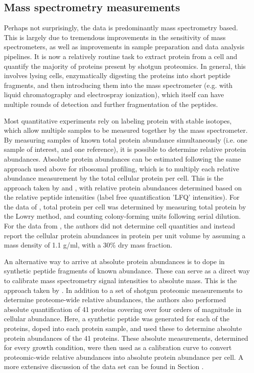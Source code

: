 \subsection{Mass spectrometry measurements}
Perhaps not surprisingly, the data is predominantly mass spectrometry based. This is
largely due to tremendous improvements in the sensitivity of mass spectrometers,
as well as improvements in sample preparation and data analysis
pipelines. It is now a relatively routine task to extract protein from a cell
and quantify the majority of proteins present by shotgun proteomics. In general, this
involves lysing cells, enzymatically digesting the proteins into short peptide
fragments, and then introducing them into the mass spectrometer (e.g.
with liquid chromatography and electrospray ionization), which itself can
have multiple rounds of detection and further fragmentation of the peptides.

Most quantitative experiments rely on labeling protein with stable isotopes,
which allow multiple samples to be measured together by the mass spectrometer.
By measuring samples of known total protein abundance simultaneously (i.e. one
sample of interest, and one reference), it is possible to determine relative
protein abundances. Absolute protein abundances can be estimated following the
same approach used above for ribosomal profiling, which is to multiply each
relative abundance measurement by the total cellular protein per cell. This is
the approach taken by \cite{valgepea2013, peebo2015} and \cite{soufi2015}, with
relative protein abundances determined based on the relative peptide intensities
(label free quantification 'LFQ' intensities). For the data of
\cite{valgepea2013}, total protein per cell was determined by measuring  total
protein by the Lowry method, and counting colony-forming units following serial
dilution. For the data from   \cite{peebo2015}, the authors did not determine
cell quantities and instead report the cellular protein abundances in protein
per unit  volume by assuming a mass density of 1.1 g/ml, with a 30\% dry mass
fraction.

An alternative way to arrive at absolute protein abundances is to dope in
synthetic peptide  fragments of known abundance. These can serve as a direct way
to calibrate mass spectrometry  signal intensities to absolute mass. This is the
approach taken by \cite{schmidt2016}. In addition  to a set of shotgun proteomic
measurements to determine proteome-wide relative abundances,  the authors also
performed absolute quantification of  41 proteins covering over four orders of
magnitude in cellular abundance. Here,  a synthetic peptide was generated for
each of the proteins, doped into each protein sample, and used these to
determine absolute protein abundances of the 41 proteins. These absolute
measurements, determined for every growth condition,  were then used as a
calibration curve to convert proteomic-wide relative abundances into  absolute
protein abundance per cell. A more extensive discussion of the
\cite{schmidt2016} data set can be found in Section .

